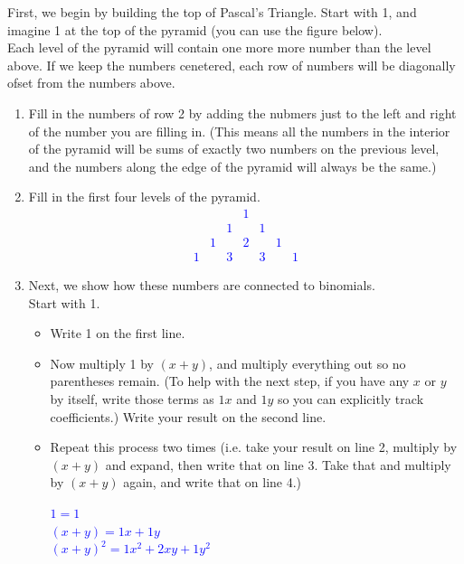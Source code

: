 \documentclass{ximera}
\begin{document}
\begin{exercise}
    First, we begin by building the top of Pascal's Triangle.  Start with 1, and imagine 1 at the top of the pyramid (you can use the figure below).\\
    Each level of the pyramid will contain one more more number than the level above.  If we keep the numbers cenetered, each row of numbers will be diagonally ofset from the numbers above.
    \begin{enumerate}
        \item Fill in the numbers of row 2 by adding the nubmers just to the left and right of the number you are filling in. (This means all the numbers in the interior of the pyramid will be sums of exactly two numbers on the previous level, and the numbers along the edge of the pyramid will always be the same.)
        \item Fill in the first four levels of the pyramid.
        \textcolor{blue}{
        \begin{align}
               & & & 1 & & & \\
               & & 1 & & 1 & &\\
               & 1 & & 2 & & 1 & \\
               1 & & 3 & & 3 & & 1
        \end{align}}
        \item Next, we show how these numbers are connected to binomials.\\
        Start with 1.\\
        \begin{itemize}
            \item Write 1 on the first line.
            \item Now multiply 1 by $(x+y)$, and multiply everything out so no parentheses remain.  (To help with the next step, if you have any $x$ or $y$ by itself, write those terms as $1x$ and $1y$ so you can explicitly track coefficients.)  Write your result on the second line.
            \item Repeat this process two times (i.e. take your result on line 2, multiply by $(x+y)$ and expand, then write that on line 3.  Take that and multiply by $(x+y)$ again, and write that on line 4.)\\
            \textcolor{blue}{
            \begin{center}
                $1=1$\\
                $(x+y)=1x+1y$\\
                $(x+y)^2=1x^2+2xy+1y^2$\\

\end{center}}
\end{itemize}
\end{enumerate}
\end{exercise}
\end{document}
